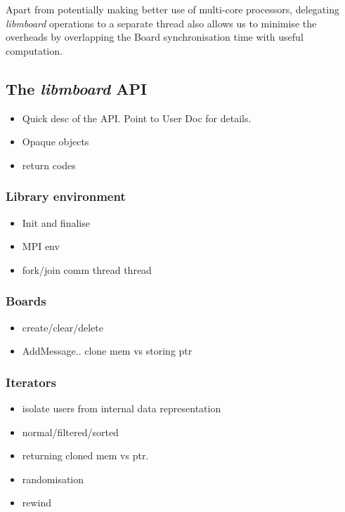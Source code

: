 Apart from potentially making better use of multi-core processors, delegating \textit{libmboard} operations to a separate thread also allows us to minimise the overheads by overlapping the Board synchronisation time with useful computation.

\subsection{The \textit{libmboard} API}

\begin{itemize}
\item Quick desc of the API. Point to User Doc for details.
\item Opaque objects
\item return codes
\end{itemize} 


\subsubsection{Library environment}

\begin{itemize}
\item Init and finalise
\item MPI env
\item fork/join comm thread thread
\end{itemize} 

\subsubsection{Boards}

\begin{itemize}
\item create/clear/delete
\item AddMessage.. clone mem vs storing ptr
\end{itemize} 

\subsubsection{Iterators}

\begin{itemize}
\item isolate users from internal data representation
\item normal/filtered/sorted
\item returning cloned mem vs ptr.
\item randomisation
\item rewind
\end{itemize} 

